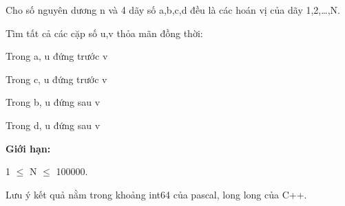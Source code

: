 Cho số nguyên dương n và 4 dãy số a,b,c,d đều là các hoán vị của dãy 1,2,…,N.  

   Tìm tất cả các cặp số u,v thỏa mãn đồng thời:  

   Trong a, u đứng trước v  

   Trong c, u đứng trước v  

   Trong b, u đứng sau v  

   Trong d, u đứng sau v  

\textbf{    Giới hạn:   }

   1  $\le$  N  $\le$  100000.  

   Lưu ý kết quả nằm trong khoảng int64 của pascal, long long của C++.  

\